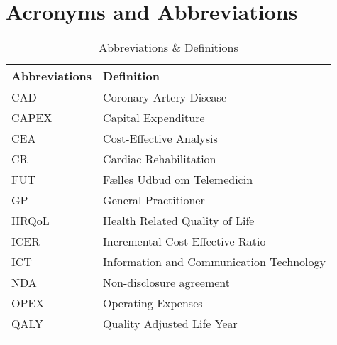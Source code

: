 \chapter{Acronyms and Abbreviations}


\begin{longtabu} to 
	\textbf{Abbreviations} & \textbf{Definition}\\[-1ex]
	\midrule
	CAD & Coronary Artery Disease \\[-1ex]
	CAPEX & Capital Expenditure \\[-1ex]
	CEA & Cost-Effective Analysis \\[-1ex]
	CR & Cardiac Rehabilitation \\[-1ex]
	FUT & Fælles Udbud om Telemedicin \\[-1ex]
	GP & General Practitioner \\[-1ex]
	HRQoL & Health Related Quality of Life \\[-1ex]
	ICER & Incremental Cost-Effective Ratio \\[-1ex]
	ICT & Information and Communication Technology \\[-1ex]
	NDA & Non-disclosure agreement \\[-1ex]
	OPEX & Operating Expenses \\[-1ex]
	QALY & Quality Adjusted Life Year \\[-1ex]
	\caption{Abbreviations \& Definitions}
\end{longtabu}



